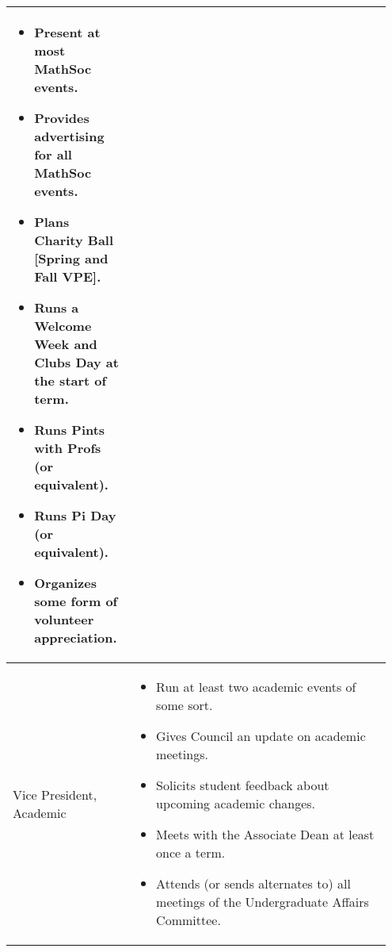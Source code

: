 \documentclass[12pt, letterpaper]{article}
\begin{document}
\begin{longtable}{p{0.3\linewidth} p{0.65\linewidth}}
\begin{itemize}
		\item Present at most MathSoc events.
		\item Provides advertising for all MathSoc events.
		\item Plans Charity Ball [Spring and Fall VPE].
		\item Runs a Welcome Week and Clubs Day at the start of term.
		\item Runs Pints with Profs (or equivalent).
		\item Runs Pi Day (or equivalent).
		\item Organizes some form of volunteer appreciation.
	\end{itemize}
	\\
	\midrule
	Vice President, Academic &
	\begin{itemize}
		\item Run at least two academic events of some sort.
		\item Gives Council an update on academic meetings.
		\item Solicits student feedback about upcoming academic changes.
		\item Meets with the Associate Dean at least once a term.
		\item Attends (or sends alternates to) all meetings of the Undergraduate Affairs Committee.
	\end{itemize}
	\\
	\bottomrule
\end{longtable}
\end{document}
